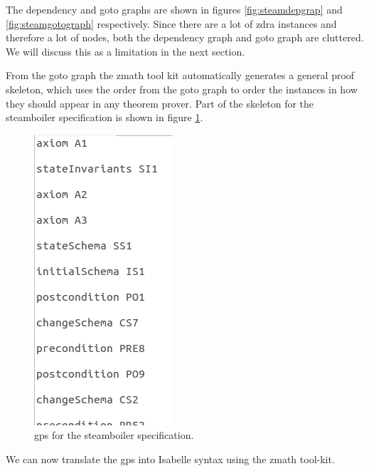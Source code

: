 The dependency and goto graphs are shown in figures \ref{fig:steamdepgrap} and
\ref{fig:steamgotograph} respectively. Since there are a lot of \gls{zdra}
instances and therefore a lot of nodes, both the dependency graph and goto graph
are cluttered. We will discuss this as a limitation in the next section.

From the goto graph the \gls{zmath} tool kit automatically generates a general
proof skeleton, which uses the order from the goto graph to order the instances
in how they should appear in any theorem prover. Part of the skeleton for the
steamboiler specification is shown in figure \ref{fig:steamgpsa}.

\begin{figure}[H]
\includegraphics[scale=0.5]{Figures/Evaluation/steamboilergpsa.png}
\caption{\Gls{gps} for the steamboiler specification. \label{fig:steamgpsa}}
\end{figure}

We can now translate the \gls{gps} into Isabelle syntax using the \gls{zmath}
tool-kit.


